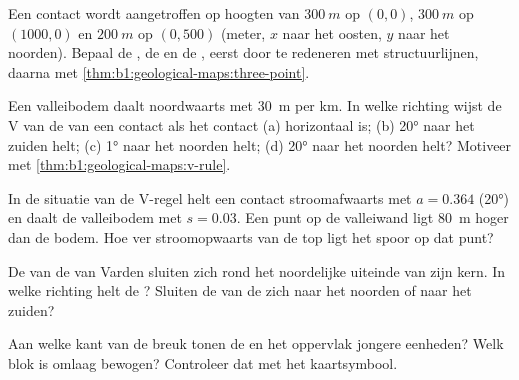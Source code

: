 \begin{exercise}[$\star\star$]\label{exo:b1:geological-maps:5}
Een contact wordt aangetroffen op hoogten van $\qty{300}{m}$ op $(0, 0)$, $\qty{300}{m}$ op $(1000, 0)$ en
$\qty{200}{m}$ op $(0, 500)$ (meter, $x$ naar het oosten, $y$ naar het noorden). Bepaal de , de
 en de , eerst door te redeneren met structuurlijnen, daarna met
\cref{thm:b1:geological-maps:three-point}.
\end{exercise}

\begin{exercise}[$\star\star$]\label{exo:b1:geological-maps:6}
Een valleibodem daalt noordwaarts met \qty{30}{m} per km. In welke richting wijst de V van de 
van een contact als het contact (a) horizontaal is; (b) \ang{20} naar het zuiden helt; (c) \ang{1} naar het
noorden helt; (d) \ang{20} naar het noorden helt? Motiveer met \cref{thm:b1:geological-maps:v-rule}.
\end{exercise}

\begin{exercise}[$\star\star$]\label{exo:b1:geological-maps:7}
In de situatie van de V-regel helt een contact stroomafwaarts met $a = 0.364$ (\ang{20}) en daalt de
valleibodem met $s = 0.03$. Een punt op de valleiwand ligt \qty{80}{m} hoger dan de bodem. Hoe ver
stroomopwaarts van de top ligt het spoor op dat punt?
\end{exercise}

\begin{exercise}[$\star\star$]\label{exo:b1:geological-maps:8}
De  van de  van Varden sluiten zich rond het noordelijke uiteinde van zijn kern.
In welke richting helt de ? Sluiten de  van de  zich naar het noorden of
naar het zuiden?
\end{exercise}

\begin{exercise}[$\star\star$]\label{exo:b1:geological-maps:9}
Aan welke kant van de breuk tonen de  en het oppervlak jongere eenheden? Welk blok is
omlaag bewogen? Controleer dat met het kaartsymbool.
\end{exercise}

